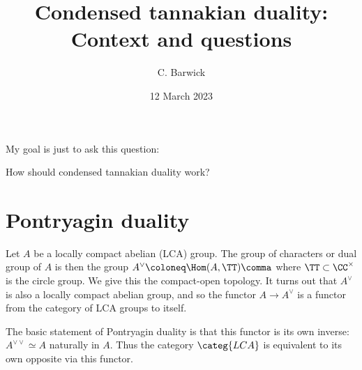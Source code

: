 \documentclass[leqno]{article}
\title{Condensed tannakian duality:
Context and questions}
\author{C. Barwick}
\date{12 March 2023}
\begin{document}
\maketitle

My goal is just to ask this question:
\begin{qst*}
    How should condensed tannakian duality work?
\end{qst*}

\section{Pontryagin duality}%
\label{pontryagin}

Let \(A\) be a locally compact abelian (LCA) group.
The group of characters or dual group of \(A\) is then the group
\(A^{\vee} \coloneq \Hom(A,\TT) \comma\)
where \(\TT \subset \CC^{\times}\) is the circle group.
We give this the compact-open topology.
It turns out that \(A^{\vee}\) is also a locally compact abelian group,
and so the functor \(A \to A^{\vee}\) is a functor from
the category of LCA groups to itself.


The basic statement of Pontryagin duality is that this functor
is its own inverse: \(A^{\vee\vee} \simeq A\) naturally in \(A\).
Thus the category \(\categ{LCA}\) is equivalent to its own opposite
via this functor.
\end{document}
